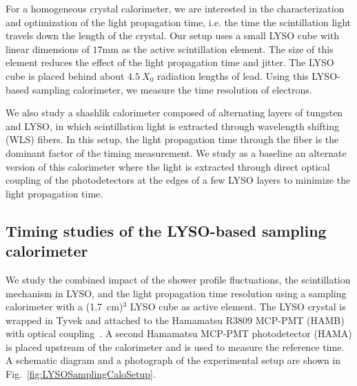 For a homogeneous crystal calorimeter, we are interested in the characterization and 
optimization of the light propagation time, i.e. the time the scintillation light travels
down the length of the crystal. Our setup uses a small LYSO cube with linear dimensions 
of $17\mathrm{mm}$ as the active scintillation element. The size of this element reduces 
the effect of the light propagation time and jitter. The LYSO cube is placed behind about 
$4.5~X_0$ radiation lengths of lead. Using this LYSO-based sampling calorimeter, we
measure the time resolution of electrons.

We also study a shashlik calorimeter composed of alternating layers of
tungsten and LYSO, in which scintillation light is extracted through wavelength
shifting (WLS) fibers. In this setup, the light propagation time through the fiber is the
dominant factor of the timing measurement. We study as a baseline an alternate version of this
calorimeter where the light is extracted through direct optical coupling of  the 
photodetectors at the edges of a few LYSO layers to minimize  the light propagation time.


\subsection{Timing studies of the LYSO-based sampling calorimeter}

We study the combined impact of the shower profile fluctuations, the
scintillation mechanism in LYSO, and the light propagation time resolution
using a sampling calorimeter with a (1.7~cm)$^{3}$ LYSO cube as active
element. The LYSO crystal is wrapped in Tyvek and attached to the Hamamatsu
R3809 MCP-PMT (HAMB) with optical coupling~\cite{grease}.   A second Hamamatsu 
MCP-PMT  photodetector (HAMA)  is placed upstream of the calorimeter and is used 
to measure the reference time. A schematic diagram and a photograph of the experimental setup
are shown in Fig.~\ref{fig:LYSOSamplingCaloSetup}. 


